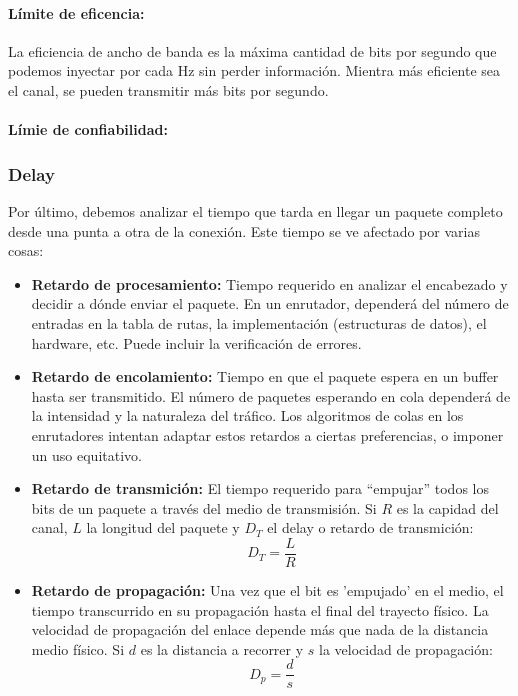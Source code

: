 \paragraph{Límite de eficencia:} La eficiencia de ancho de banda es la máxima cantidad de bits por segundo que podemos inyectar por cada Hz sin perder información. Mientra más eficiente sea el canal, se pueden transmitir más bits por segundo. 

\paragraph{Límie de confiabilidad:} 

\subsubsection{Delay}
Por último, debemos analizar el tiempo que tarda en llegar un paquete completo desde una punta a otra de la conexión. Este tiempo se ve afectado por varias cosas:
  \begin{itemize}
    \item \textbf{Retardo de procesamiento:} Tiempo requerido en analizar el encabezado y decidir a dónde enviar el paquete. En un enrutador, dependerá del número de entradas en la tabla de rutas, la implementación (estructuras de datos), el hardware, etc. Puede incluir la verificación de errores.
    \item \textbf{Retardo de encolamiento:} Tiempo en que el paquete espera en un buffer hasta ser transmitido. El número de paquetes esperando en cola dependerá de la intensidad y la naturaleza del tráfico. Los algoritmos de colas en los enrutadores intentan adaptar estos retardos a ciertas preferencias, o imponer un uso equitativo.
    \item \textbf{Retardo de transmición:} El tiempo requerido para “empujar” todos los bits de un paquete a través del medio de transmisión. Si \(R\) es la capidad del canal, \(L\) la longitud del paquete y \(D_T\) el delay o retardo de transmición:
    \[D_T = \frac{L}{R}\]
    \item \textbf{Retardo de propagación:} Una vez que el bit es 'empujado' en el medio, el tiempo transcurrido en su propagación hasta
    el final del trayecto físico. La velocidad de propagación del enlace depende más que nada de la distancia medio físico. Si \(d\) es la distancia a recorrer y \(s\) la velocidad de propagación:
    \[D_p = \frac{d}{s}\]
  \end{itemize}

